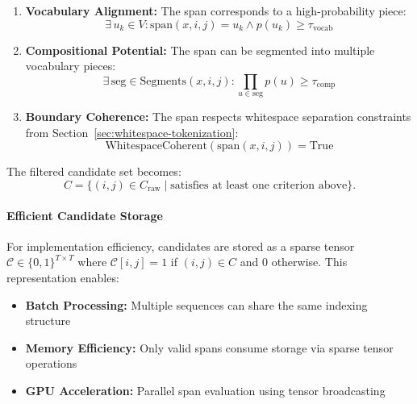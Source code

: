 \begin{enumerate}
	\item \textbf{Vocabulary Alignment:} The span corresponds to a high-probability piece:
	\begin{equation}
	\exists \, u_k \in V : \text{span}(x, i, j) = u_k \wedge p(u_k) \geq \tau_{\text{vocab}}
	\label{eq:vocab-alignment}
	\end{equation}
	
	\item \textbf{Compositional Potential:} The span can be segmented into multiple vocabulary pieces:
	\begin{equation}
	\exists \, \text{seg} \in \text{Segments}(x, i, j) : \prod_{u \in \text{seg}} p(u) \geq \tau_{\text{comp}}
	\label{eq:compositional-potential}
	\end{equation}
	
	\item \textbf{Boundary Coherence:} The span respects whitespace separation constraints from Section~\ref{sec:whitespace-tokenization}:
	\begin{equation}
	\text{WhitespaceCoherent}(\text{span}(x, i, j)) = \text{True}
	\label{eq:boundary-coherence}
	\end{equation}
\end{enumerate}

The filtered candidate set becomes:
\begin{equation}
C = \{(i,j) \in C_{\text{raw}} \mid \text{satisfies at least one criterion above}\}.
\label{eq:filtered-candidates}
\end{equation}

\paragraph{Efficient Candidate Storage}

For implementation efficiency, candidates are stored as a sparse tensor \(\mathcal{C} \in \{0,1\}^{T \times T}\) where \(\mathcal{C}[i,j] = 1\) if \((i,j) \in C\) and 0 otherwise. This representation enables:

\begin{itemize}
	\item \textbf{Batch Processing:} Multiple sequences can share the same indexing structure
	\item \textbf{Memory Efficiency:} Only valid spans consume storage via sparse tensor operations
	\item \textbf{GPU Acceleration:} Parallel span evaluation using tensor broadcasting
\end{itemize}

